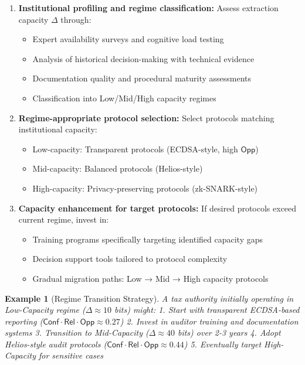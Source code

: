 \documentclass{ieeeaccess}
\newcommand{\Conf}{\mathsf{Conf}}
\newcommand{\Rel}{\mathsf{Rel}}
\newcommand{\Opp}{\mathsf{Opp}}
\newtheorem{example}{Example}[subsection]
\begin{document}
\begin{enumerate}
\item \textbf{Institutional profiling and regime classification:} Assess extraction capacity $\Delta$ through:
\begin{itemize}
\item Expert availability surveys and cognitive load testing
\item Analysis of historical decision-making with technical evidence
\item Documentation quality and procedural maturity assessments
\item Classification into Low/Mid/High capacity regimes
\end{itemize}

\item \textbf{Regime-appropriate protocol selection:} Select protocols matching institutional capacity:
\begin{itemize}
\item Low-capacity: Transparent protocols (ECDSA-style, high $\Opp$)
\item Mid-capacity: Balanced protocols (Helios-style)
\item High-capacity: Privacy-preserving protocols (zk-SNARK-style)
\end{itemize}

\item \textbf{Capacity enhancement for target protocols:} If desired protocols exceed current regime, invest in:
\begin{itemize}
\item Training programs specifically targeting identified capacity gaps
\item Decision support tools tailored to protocol complexity
\item Gradual migration paths: Low → Mid → High capacity protocols
\end{itemize}
\end{enumerate}

\begin{example}[Regime Transition Strategy]
A tax authority initially operating in Low-Capacity regime ($\Delta \approx 10$ bits) might:
1. Start with transparent ECDSA-based reporting ($\Conf \cdot \Rel \cdot \Opp \approx 0.27$)
2. Invest in auditor training and documentation systems
3. Transition to Mid-Capacity ($\Delta \approx 40$ bits) over 2-3 years
4. Adopt Helios-style audit protocols ($\Conf \cdot \Rel \cdot \Opp \approx 0.44$)
5. Eventually target High-Capacity for sensitive cases
\end{example}
\end{document}
